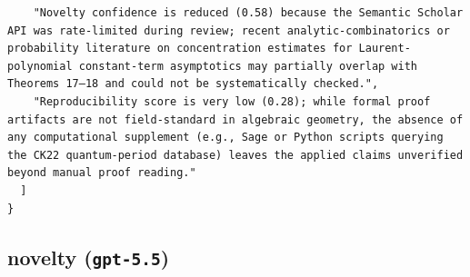 \documentclass[11pt]{article}
\begin{document}
\begin{verbatim}
    "Novelty confidence is reduced (0.58) because the Semantic Scholar API was rate-limited during review; recent analytic-combinatorics or probability literature on concentration estimates for Laurent-polynomial constant-term asymptotics may partially overlap with Theorems 17–18 and could not be systematically checked.",
    "Reproducibility score is very low (0.28); while formal proof artifacts are not field-standard in algebraic geometry, the absence of any computational supplement (e.g., Sage or Python scripts querying the CK22 quantum-period database) leaves the applied claims unverified beyond manual proof reading."
  ]
}
\end{verbatim}

\subsection*{novelty (\texttt{gpt-5.5})}
\end{document}
